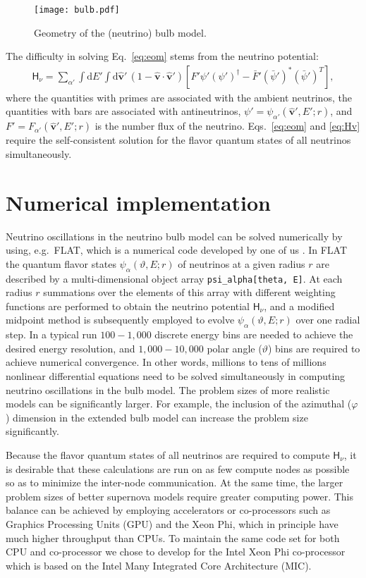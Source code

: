 \documentclass{sig-alternate}
\newcommand{\bhv}{\hat{\mathbf{v}}}
\newcommand{\rmd}{\mathrm{d}}
\newcommand{\sfH}{\mathsf{H}}
\begin{document}
\begin{figure}
\centering
\texttt{[image: bulb.pdf]}
\caption{Geometry of the (neutrino) bulb model.}
\label{fig:bulb}
\end{figure}

The difficulty in solving Eq.~\eqref{eq:eom} stems from the neutrino
potential:
\begin{align}
\sfH_\nu = \sum_{\alpha'} \int\!\rmd E'\int\!\rmd\bhv'\,
(1-\bhv\cdot\bhv')[F'\psi'(\psi')^\dagger
-\bar{F}'(\bar\psi')^*(\bar\psi')^T],
\label{eq:Hv}
\end{align}
where the quantities with primes are associated with the ambient
neutrinos, the quantities with bars are associated with
antineutrinos, $\psi'=\psi_{\alpha'}(\bhv',E';r)$, and
$F'=F_{\alpha'}(\bhv',E';r)$ is the number flux of the neutrino.
Eqs.~\eqref{eq:eom} and \eqref{eq:Hv} require the self-consistent solution for the flavor quantum states of all neutrinos simultaneously.



\section{Numerical implementation}
Neutrino oscillations in the neutrino bulb model can be solved
numerically by using, e.g.\ FLAT, which is a numerical code developed
by one of us \cite{Duan_Simulating_2008}. In FLAT the quantum flavor
states $\psi_\alpha(\vartheta,E;r)$ of neutrinos at a given radius $r$
are described by a multi-dimensional object array 
\texttt{psi\_alpha[theta, E]}. At each radius $r$ summations over the elements of this array with different weighting functions are performed to obtain the
neutrino potential $\sfH_\nu$,
and a modified midpoint method is subsequently employed to evolve
$\psi_\alpha(\vartheta,E;r)$ over one radial step. In a typical run
$100-1,000$ discrete energy bins are needed to achieve the desired
energy resolution, and $1,000-10,000$ polar angle ($\vartheta$) bins
are required to 
achieve numerical convergence. In other words, millions to tens of
millions nonlinear differential equations need to be solved
simultaneously in computing neutrino oscillations in the bulb model.
The problem sizes of more realistic models can be significantly
larger. For example, the inclusion of the azimuthal ($\varphi$) dimension in the
extended bulb model can increase the problem size significantly.

Because the flavor quantum states of all neutrinos are required to
compute $\sfH_\nu$, it is desirable that these calculations are run on
as few compute nodes as possible so as to minimize the inter-node communication. At the same time, the larger problem sizes of better supernova models
require greater computing power. This balance can be achieved by
employing accelerators or co-processors such as Graphics Processing Units (GPU) and the Xeon Phi, which in principle have much higher throughput than CPUs. 
To maintain the same code set for both CPU and co-processor we chose to
develop for the Intel Xeon Phi co-processor which is based on the Intel
Many Integrated Core Architecture (MIC).
\end{document}
